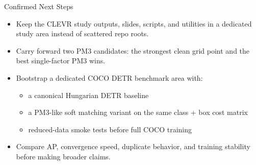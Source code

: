 \documentclass[aspectratio=169]{beamer}
\begin{document}
\begin{frame}{Confirmed Next Steps}
\small
\begin{itemize}
  \item Keep the CLEVR study outputs, slides, scripts, and utilities in a dedicated study area instead of scattered repo roots.
  \item Carry forward two PM3 candidates: the strongest clean grid point and the best single-factor PM3 wins.
  \item Bootstrap a dedicated COCO DETR benchmark area with:
  \begin{itemize}
    \item a canonical Hungarian DETR baseline
    \item a PM3-like soft matching variant on the same class + box cost matrix
    \item reduced-data smoke tests before full COCO training
  \end{itemize}
  \item Compare AP, convergence speed, duplicate behavior, and training stability before making broader claims.
\end{itemize}
\end{frame}
\end{document}
